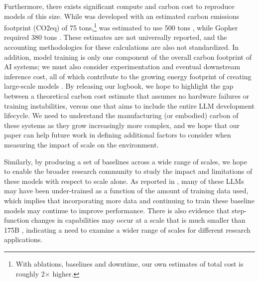 Furthermore, there exists significant compute and carbon cost to reproduce models of this size.  While \OPT{} was developed with an estimated carbon emissions footprint (CO2eq) of 75 tons,\footnote{With ablations, baselines and downtime, our own estimates of total cost is roughly 2$\times$ higher.} \biggpt{} was estimated to use 500 tons \cite{patterson2021carbon}, while Gopher required 380 tons \cite{gopher2022}.  These estimates are not universally reported, and the accounting methodologies for these calculations are also not standardized. In addition, model training is only one component of the overall carbon footprint of AI systems; we must also consider experimentation and eventual downstream inference cost, all of which contribute to the growing energy footprint of creating large-scale models \cite{sustainable_ai2021}.  By releasing our logbook, we hope to highlight the gap between a theoretical carbon cost estimate that assumes no hardware failures or training instabilities, versus one that aims to include the entire LLM development lifecycle.  We need to understand the manufacturing (or embodied) carbon of these systems \cite{gupta2021chasing} as they grow increasingly more complex, and we hope that our paper can help future work in defining additional factors to consider when measuring the impact of scale on the environment.


Similarly, by producing a set of baselines across a wide range of scales, we hope to enable the broader research community to study the impact and limitations of these models with respect to scale alone. As reported in \citet{chinchilla2022}, many of these LLMs may have been under-trained as a function of the amount of training data used, which implies that incorporating more data and continuing to train these baseline models may continue to improve performance.  There is also evidence that step-function changes in capabilities may occur at a scale that is much smaller than 175B \cite{flan2021}, indicating a need to examine a wider range of scales for different research applications.
